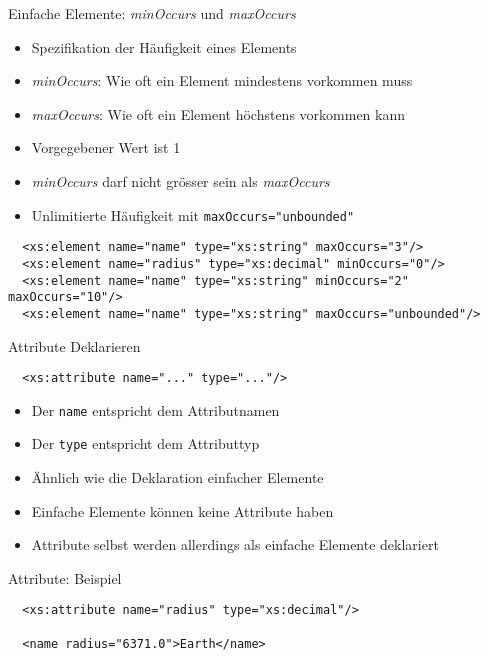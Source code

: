 \documentclass{beamer}
\begin{document}
\begin{frame}[fragile]{Einfache Elemente: \emph{minOccurs} und \emph{maxOccurs}}
	
	\begin{itemize}
		\item Spezifikation der Häufigkeit eines Elements
		\item \emph{minOccurs}: Wie oft ein Element mindestens vorkommen muss
		\item \emph{maxOccurs}: Wie oft ein Element höchstens vorkommen kann
		\item Vorgegebener Wert ist 1
		\item \emph{minOccurs} darf nicht grösser sein als \emph{maxOccurs}
		\item Unlimitierte Häufigkeit mit \texttt{maxOccurs="unbounded"}
	\end{itemize}
	
	\lstset{language=XML}
	\footnotesize
	\begin{lstlisting}	
  <xs:element name="name" type="xs:string" maxOccurs="3"/>
  <xs:element name="radius" type="xs:decimal" minOccurs="0"/>
  <xs:element name="name" type="xs:string" minOccurs="2" maxOccurs="10"/>
  <xs:element name="name" type="xs:string" maxOccurs="unbounded"/>
	\end{lstlisting}
	
\end{frame}

\begin{frame}[fragile]{Attribute Deklarieren}
	
	\lstset{language=XML}
	\begin{lstlisting}	
  <xs:attribute name="..." type="..."/>
	\end{lstlisting}
	
	\begin{itemize}
		\item Der \texttt{name} entspricht dem Attributnamen
		\item Der \texttt{type} entspricht dem Attributtyp
		\item Ähnlich wie die Deklaration einfacher Elemente
		\item Einfache Elemente können keine Attribute haben
		\item Attribute selbst werden allerdings als einfache Elemente deklariert
	\end{itemize}
	
\end{frame}

\begin{frame}[fragile]{Attribute: Beispiel}
	
	\lstset{language=XML}
	\begin{lstlisting}	
  <xs:attribute name="radius" type="xs:decimal"/>
	
  <name radius="6371.0">Earth</name>
	\end{lstlisting}
	
\end{frame}
\end{document}
